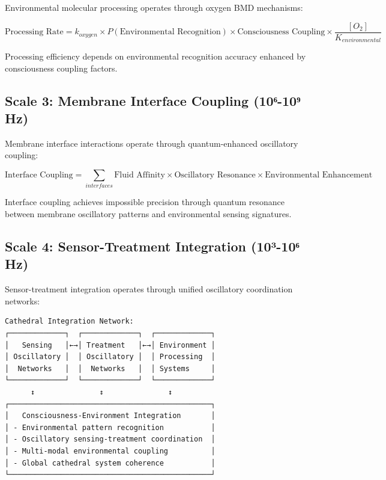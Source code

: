 \documentclass[12pt,a4paper]{article}
\begin{document}
Environmental molecular processing operates through oxygen BMD mechanisms:

\begin{equation}
\text{Processing Rate} = k_{oxygen} \times P(\text{Environmental Recognition}) \times \text{Consciousness Coupling} \times \frac{[O_2]}{K_{environmental}}
\end{equation}

Processing efficiency depends on environmental recognition accuracy enhanced by consciousness coupling factors.

\subsection{Scale 3: Membrane Interface Coupling (10⁶-10⁹ Hz)}

Membrane interface interactions operate through quantum-enhanced oscillatory coupling:

\begin{equation}
\text{Interface Coupling} = \sum_{interfaces} \text{Fluid Affinity} \times \text{Oscillatory Resonance} \times \text{Environmental Enhancement}
\end{equation}

Interface coupling achieves impossible precision through quantum resonance between membrane oscillatory patterns and environmental sensing signatures.

\subsection{Scale 4: Sensor-Treatment Integration (10³-10⁶ Hz)}

Sensor-treatment integration operates through unified oscillatory coordination networks:

\begin{verbatim}
Cathedral Integration Network:
┌─────────────┐  ┌─────────────┐  ┌─────────────┐
│   Sensing   │←→│ Treatment   │←→│ Environment │
│ Oscillatory │  │ Oscillatory │  │ Processing  │
│  Networks   │  │  Networks   │  │ Systems     │
└─────────────┘  └─────────────┘  └─────────────┘
      ↕               ↕               ↕
┌───────────────────────────────────────────────┐
│   Consciousness-Environment Integration       │
│ - Environmental pattern recognition           │
│ - Oscillatory sensing-treatment coordination  │
│ - Multi-modal environmental coupling          │
│ - Global cathedral system coherence           │
└───────────────────────────────────────────────┘
\end{verbatim}
\end{document}
